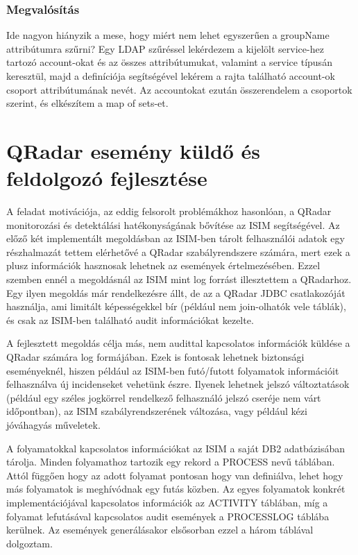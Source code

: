 	\subsubsection{Megvalósítás}
	\laci Ide nagyon hiányzik a mese, hogy miért nem lehet egyszerűen a groupName attribútumra szűrni?
		Egy LDAP szűréssel lekérdezem a kijelölt service-hez tartozó account-okat és az összes attribútumukat, valamint a service típusán keresztül, majd a definíciója segítségével lekérem a rajta található account-ok csoport attribútumának nevét. Az accountokat ezután összerendelem a csoportok szerint, és elkészítem a map of sets-et.
	
	
\section{QRadar esemény küldő és feldolgozó fejlesztése}
A feladat motivációja, az eddig felsorolt problémákhoz hasonlóan, a QRadar monitorozási és detektálási hatékonyságának bővítése az ISIM segítségével. Az előző két implementált megoldásban az ISIM-ben tárolt felhasználói adatok egy részhalmazát tettem elérhetővé a QRadar szabályrendszere számára, mert ezek a plusz információk hasznosak lehetnek az események értelmezésében. Ezzel szemben ennél a megoldásnál az ISIM mint log forrást illesztettem a QRadarhoz. Egy ilyen megoldás már rendelkezésre állt, de az a QRadar JDBC csatlakozóját használja, ami limitált képességekkel bír (például nem join-olhatók vele táblák), és csak az ISIM-ben található audit információkat kezelte.

A fejlesztett megoldás célja más, nem audittal kapcsolatos információk küldése a QRadar számára log formájában. Ezek is fontosak lehetnek biztonsági eseményeknél, hiszen például az ISIM-ben futó/futott folyamatok információit felhasználva új incidenseket vehetünk észre. Ilyenek lehetnek jelszó változtatások (például egy széles jogkörrel rendelkező felhasználó jelszó cseréje nem várt időpontban), az ISIM szabályrendszerének változása, vagy például kézi jóváhagyás műveletek. 

A folyamatokkal kapcsolatos információkat az ISIM a saját DB2 adatbázisában tárolja. Minden folyamathoz tartozik egy rekord a PROCESS nevű táblában. Attól függően hogy az adott folyamat pontosan hogy van definiálva, lehet hogy más folyamatok is meghívódnak egy futás közben. Az egyes folyamatok konkrét implementációjával kapcsolatos információk az ACTIVITY táblában, míg a folyamat lefutásával kapcsolatos audit események a PROCESSLOG táblába kerülnek. Az események generálásakor elsősorban ezzel a három táblával dolgoztam.

